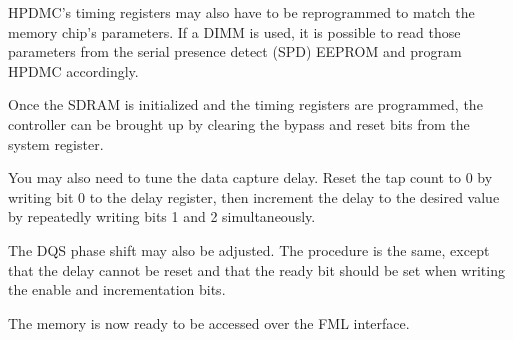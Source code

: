 \documentclass[a4paper,11pt]{article}
\begin{document}
HPDMC's timing registers may also have to be reprogrammed to match the memory chip's parameters. If a DIMM is used, it is possible to read those parameters from the serial presence detect (SPD) EEPROM and program HPDMC accordingly.

Once the SDRAM is initialized and the timing registers are programmed, the controller can be brought up by clearing the bypass and reset bits from the system register.

You may also need to tune the data capture delay. Reset the tap count to 0 by writing bit 0 to the delay register, then increment the delay to the desired value by repeatedly writing bits 1 and 2 simultaneously.

The DQS phase shift may also be adjusted. The procedure is the same, except that the delay cannot be reset and that the ready bit should be set when writing the enable and incrementation bits.

The memory is now ready to be accessed over the FML interface.
\end{document}
